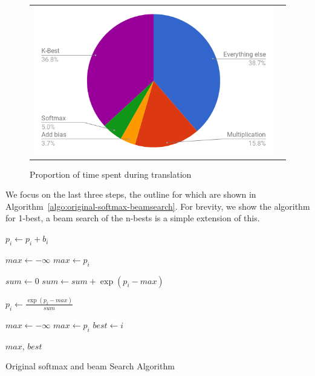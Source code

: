 \documentclass[11pt,a4paper]{article}
\begin{document}
\begin{figure}
\centering
\begin{tabular}{cc}
{\includegraphics[scale=0.3]{pie-time.png}} 
\end{tabular}
\caption{Proportion of time spent during translation}
\label{fig:pie-time}
\end{figure} 

We focus on the last three steps, the outline for which are shown in Algorithm~\ref{algo:original-softmax-beamsearch}. For brevity, we show the algorithm for 1-best, a beam search of the n-bests is a simple extension of this.

\begin{algorithm} 
\begin{algorithmic}

  \State $p_i \gets p_i + b_i$
\EndFor 
\EndProcedure

\State


\State $max \gets - \infty$ 
    \State $max \gets p_i$
  \EndIf
\EndFor

\State $sum \gets 0$ 
  \State $sum \gets sum + \exp(p_i - max)$
\EndFor

  \State $p_i \gets \frac{\exp(p_i - max)}{sum} $
\EndFor 

\EndProcedure

\State


\State $max \gets - \infty$ 
    \State $max \gets p_i$
    \State $best \gets i$
  \EndIf
\EndFor 

\Return $max$, $best$

\EndProcedure

\end{algorithmic}
\caption{Original softmax and beam Search Algorithm}
\label{algo:original-softmax-beamsearch}
\end{algorithm}
\end{document}
